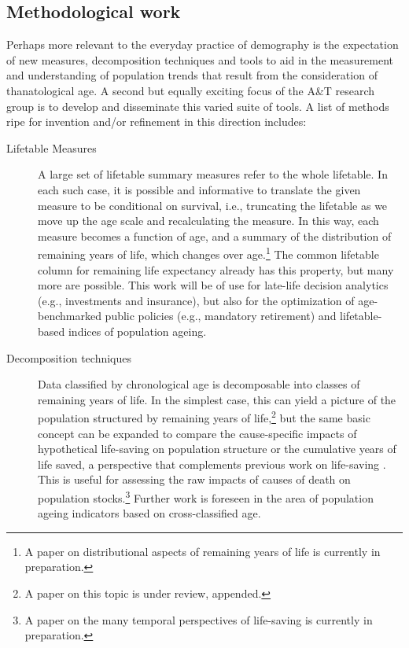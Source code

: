 \documentclass[a4paper,12pt]{article}
\begin{document}
\subsection{Methodological work}
Perhaps more relevant to the everyday practice of demography is the expectation
of new measures, decomposition techniques and tools to aid in the measurement
and understanding of population trends that result from the consideration of
thanatological age. A second but equally exciting focus of the A\&T research
group is to develop and disseminate this varied suite of tools. A list of
methods ripe for invention and/or refinement in this direction includes:

\begin{description}
\item[Lifetable Measures]{A large set of lifetable summary measures refer to
the whole lifetable. In each such case, it is possible and
informative to translate the given measure to be conditional on survival, i.e.,
truncating the lifetable as we move up the age scale and recalculating the
measure. In this way, each measure becomes a function of age, and a summary of
the distribution of remaining years of life, which changes over age.\footnote{A
paper on distributional aspects of remaining years of life is currently in
preparation.} The common lifetable column for remaining life expectancy already has this property, but
many more are possible. This work will be of use for late-life decision
analytics (e.g., investments and insurance), but also for the optimization of
age-benchmarked public policies (e.g., mandatory retirement) and
lifetable-based indices of population ageing.}
\item[Decomposition techniques]{Data classified by chronological age is
decomposable into classes of remaining years of life. In the simplest case,
this can yield a picture of the population structured by remaining years of
life,\footnote{A paper on this topic is under review, appended.} but the same basic concept can be expanded to compare the
cause-specific impacts of hypothetical life-saving on population structure or
the cumulative years of life saved, a perspective that complements previous work
on life-saving \cite{vaupel1987repeated,vaupel2008lifesaving}. This is useful
for assessing the raw impacts of causes of death on population stocks.\footnote{A paper on the many temporal perspectives of life-saving is currently in
preparation.} Further work is foreseen in the area of population ageing
indicators based on cross-classified age.}
\end{description}
\end{document}
